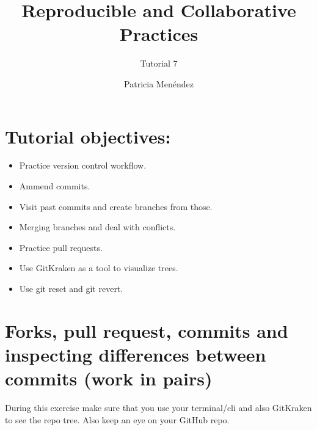 \documentclass[
]{article}
\title{Reproducible and Collaborative Practices}
\subtitle{Tutorial 7}
\author{Patricia Menéndez}
\date{}
\begin{document}
\maketitle

{
\setcounter{tocdepth}{2}
\tableofcontents
}
\section*{Tutorial objectives:}
\begin{tcolorbox}
 \begin{itemize}
   \item Practice version control workflow.
   \item Ammend commits.
   \item Visit past commits and create branches from those.
   \item Merging branches and deal with conflicts.
   \item Practice pull requests.
   \item Use GitKraken as a tool to visualize trees.
   \item Use git reset and git revert.
 \end{itemize}
\end{tcolorbox}

\clearpage

\hypertarget{forks-pull-request-commits-and-inspecting-differences-between-commits-work-in-pairs}{%
\section{Forks, pull request, commits and inspecting differences between
commits (work in
pairs)}\label{forks-pull-request-commits-and-inspecting-differences-between-commits-work-in-pairs}}

During this exercise make sure that you use your terminal/cli and also
GitKraken to see the repo tree. Also keep an eye on your GitHub repo.
\end{document}
